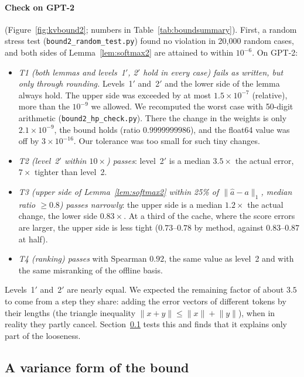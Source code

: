 \documentclass[10pt]{article}
\theoremstyle{plain}
\theoremstyle{definition}
\theoremstyle{remark}
\newcommand{\rl}[1]{\textsf{#1}}%
\begin{document}
\paragraph{Check on GPT-2} (Figure~\ref{fig:kvbound2}; numbers in Table~\ref{tab:boundsummary}). First, a random stress test (\texttt{bound2\_random\_test.py}) found no violation in 20{,}000 random cases, and both sides of Lemma~\ref{lem:softmax2} are attained to within $10^{-6}$. On GPT-2:
\begin{itemize}[leftmargin=2em,itemsep=1pt]
\item \emph{\rl{T1} (both lemmas and levels~1$'$, 2$'$ hold in every case) fails as written, but only through rounding.} Levels~1$'$ and~2$'$ and the lower side of the lemma always hold. The upper side was exceeded by at most $1.5\times10^{-7}$ (relative), more than the $10^{-9}$ we allowed. We recomputed the worst case with 50-digit arithmetic (\texttt{bound2\_hp\_check.py}). There the change in the weights is only $2.1\times10^{-9}$, the bound holds (ratio $0.9999999986$), and the float64 value was off by $3\times10^{-16}$. Our tolerance was too small for such tiny changes.
\item \emph{\rl{T2} (level~2$'$ within $10\times$) passes}: level~2$'$ is a median $3.5\times$ the actual error, $7\times$ tighter than level~2.
\item \emph{\rl{T3} (upper side of Lemma~\ref{lem:softmax2} within 25\% of $\lVert\hat a-a\rVert_1$, median ratio $\ge0.8$) passes narrowly}: the upper side is a median $1.2\times$ the actual change, the lower side $0.83\times$. At a third of the cache, where the score errors are larger, the upper side is less tight ($0.73$--$0.78$ by method, against $0.83$--$0.87$ at half).
\item \emph{\rl{T4} (ranking) passes} with Spearman $0.92$, the same value as level~2 and with the same misranking of the offline basis.
\end{itemize}
Levels~1$'$ and~2$'$ are nearly equal. We expected the remaining factor of about $3.5$ to come from a step they share: adding the error vectors of different tokens by their lengths (the triangle inequality $\lVert x+y\rVert\le\lVert x\rVert+\lVert y\rVert$), when in reality they partly cancel. Section~\ref{sec:bound3} tests this and finds that it explains only part of the looseness.

\subsection{A variance form of the bound}
\label{sec:bound3}
\end{document}
